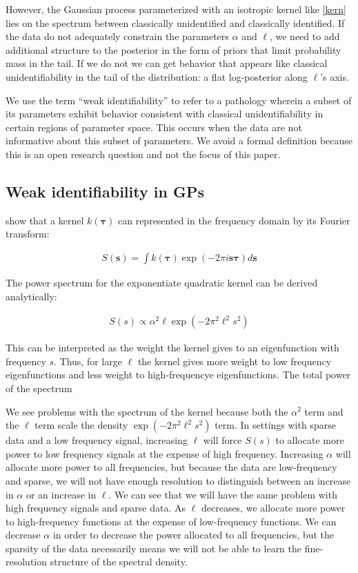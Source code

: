 \documentclass{article}
\begin{document}
However, the Gaussian process parameterized with an isotropic kernel like
\ref{kern} lies on the spectrum between classically unidentified and
classically identified. If the data do not adequately constrain the parameters
$\alpha$ and $\ell$, we need to add additional structure to the posterior in
the form of priors that limit probability mass in the tail. If we do not
we can get behavior that appears like classical unidentifiability in the 
tail of the distribution: a flat log-posterior along $\ell$'s axis. 

We use the term ``weak identifiability'' to refer to a pathology wherein a
subset of its parameters exhibit behavior consistent with classical
unidentifiability in certain regions of parameter space. This occurs when the
data are not informative about this subset of parameters.  We avoid a formal
definition because this is an open research question and not the focus of this
paper.

\subsection{Weak identifiability in GPs}

\citet{rasmussen2005gaussian} show that a kernel $k(\boldsymbol{\tau})$ can
represented in the frequency domain by its Fourier transform:

\begin{align*}
  S(\mathbf{s}) = \int k(\mathbf{\tau}) \exp \left( -2 \pi i \mathbf{s}  \boldsymbol{\tau} \right) d\mathbf{s}
\end{align*}

The power spectrum for the exponentiate quadratic kernel can be derived analytically:

\begin{align*} 
  S(s) \propto \alpha^2 \ell
   \exp \left(
  - 2 \pi^2 \ell^2 s^2
\right)
\end{align*} 

This can be interpreted as the weight the kernel gives to an eigenfunction with
frequency $s$. Thus, for large $\ell$ the kernel gives more weight to low
frequency eigenfunctions and less weight to high-frequencye eigenfunctions. The 
total power of the spectrum 

We see problems with the spectrum of the kernel because both the $\alpha ^ 2$
term and the $\ell$ term scale the density $\exp \left(- 2 \pi^2 \ell^2 s^2
\right)$ term. In settings with sparse data and a low frequency signal,
increasing $\ell$ will force $S(s)$ to allocate more power to low frequency
signals at the expense of high frequency. Increasing $\alpha$ will allocate
more power to all frequencies, but because the data are low-frequency and
sparse, we will not have enough resolution to distinguish between an increase
in $\alpha$ or an increase in $\ell$. We can see that we will have the same
problem with high frequency signals and sparse data. As $\ell$ decreases,
we allocate more power to high-frequency functions at the expense of 
low-frequency functions. We can decrease $\alpha$ in order to decrease
the power allocated to all frequencies, but the sparsity of the data
necessarily means we will not be able to learn the fine-resolution
structure of the spectral density.
\end{document}
